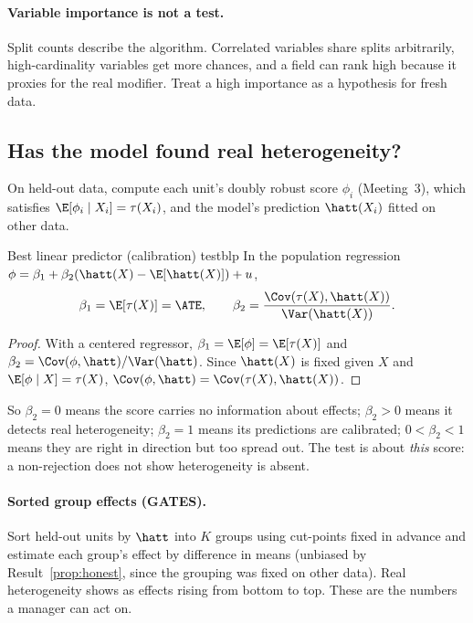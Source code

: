 \documentclass[11pt]{article}
\begin{document}
\paragraph{Variable importance is not a test.} Split counts describe the algorithm. Correlated variables share
splits arbitrarily, high-cardinality variables get more chances, and a field can rank high because it proxies
for the real modifier. Treat a high importance as a hypothesis for fresh data.

\subsection{Has the model found real heterogeneity?}

On held-out data, compute each unit's doubly robust score $\phi_i$ (Meeting~3), which satisfies
$\E[\phi_i \mid X_i] = \tau(X_i)$, and the model's prediction $\hatt(X_i)$ fitted on other data.

\begin{prop}{Best linear predictor (calibration) test}{blp}
In the population regression $\phi = \beta_1 + \beta_2(\hatt(X) - \E[\hatt(X)]) + u$,
\[
  \beta_1 = \E[\tau(X)] = \ATE, \qquad \beta_2 = \frac{\Cov(\tau(X), \hatt(X))}{\Var(\hatt(X))}.
\]
\end{prop}
\begin{proof}
With a centered regressor, $\beta_1 = \E[\phi] = \E[\tau(X)]$ and $\beta_2 = \Cov(\phi, \hatt)/\Var(\hatt)$. Since
$\hatt(X)$ is fixed given $X$ and $\E[\phi \mid X] = \tau(X)$, $\Cov(\phi, \hatt) = \Cov(\tau(X), \hatt(X))$.
\end{proof}

So $\beta_2 = 0$ means the score carries no information about effects; $\beta_2 > 0$ means it detects real
heterogeneity; $\beta_2 = 1$ means its predictions are calibrated; $0 < \beta_2 < 1$ means they are right in
direction but too spread out. The test is about \emph{this} score: a non-rejection does not show heterogeneity
is absent.

\paragraph{Sorted group effects (GATES).} Sort held-out units by $\hatt$ into $K$ groups using cut-points fixed in
advance and estimate each group's effect by difference in means (unbiased by Result~\ref{prop:honest}, since the
grouping was fixed on other data). Real heterogeneity shows as effects rising from bottom to top. These are the
numbers a manager can act on.
\end{document}
